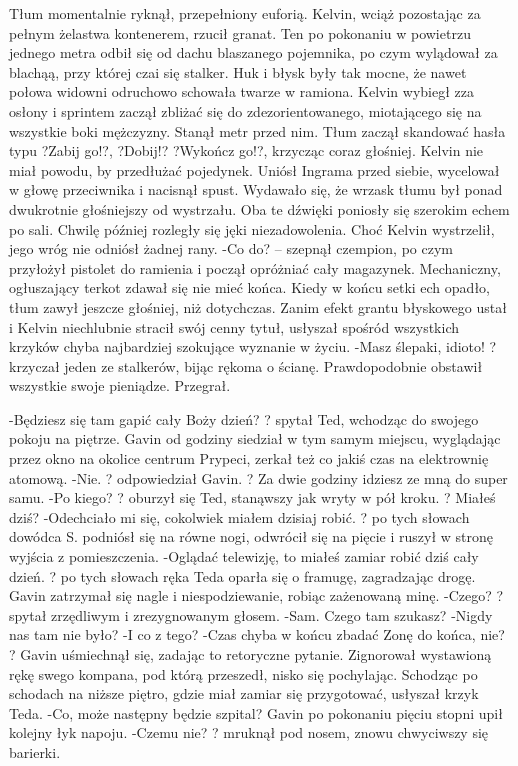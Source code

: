 \documentclass[../MAIN.tex]{subfiles}
\begin{document}
Tłum momentalnie ryknął, przepełniony euforią.
Kelvin, wciąż pozostając za pełnym żelastwa kontenerem, rzucił granat.
Ten po pokonaniu w powietrzu jednego metra odbił się od dachu blaszanego pojemnika, po czym wylądował za blachąą, przy której czai się stalker.
Huk i błysk były tak mocne, że nawet połowa widowni odruchowo schowała twarze w ramiona. Kelvin wybiegł zza osłony i sprintem zaczął zbliżać się do zdezorientowanego, miotającego się na wszystkie boki mężczyzny. Stanął metr przed nim.
Tłum zaczął skandować hasła typu ?Zabij go!?, ?Dobij!? ?Wykończ go!?, krzycząc coraz głośniej.
Kelvin nie miał powodu, by przedłużać pojedynek. Uniósł Ingrama przed siebie, wycelował w głowę przeciwnika i nacisnął spust.
Wydawało się, że wrzask tłumu był ponad dwukrotnie głośniejszy od wystrzału. Oba te dźwięki poniosły się szerokim echem po sali. Chwilę później rozległy się jęki niezadowolenia.
Choć Kelvin wystrzelił, jego wróg nie odniósł żadnej rany.
-Co do? -- szepnął czempion, po czym przyłożył pistolet do ramienia i począł opróżniać cały magazynek. Mechaniczny, ogłuszający terkot zdawał się nie mieć końca. Kiedy w końcu setki ech opadło, tłum zawył jeszcze głośniej, niż dotychczas.
Zanim efekt grantu błyskowego ustał i Kelvin niechlubnie stracił swój cenny tytuł, usłyszał spośród wszystkich krzyków chyba najbardziej szokujące wyznanie w życiu.
-Masz ślepaki, idioto! ? krzyczał jeden ze stalkerów, bijąc rękoma o ścianę. Prawdopodobnie obstawił wszystkie swoje pieniądze. Przegrał.

-Będziesz się tam gapić cały Boży dzień? ? spytał Ted, wchodząc do swojego pokoju na piętrze. Gavin od godziny siedział w tym samym miejscu, wyglądając przez okno na okolice centrum Prypeci, zerkał też co jakiś czas na elektrownię atomową.
-Nie. ? odpowiedział Gavin. ? Za dwie godziny idziesz ze mną do super samu.
-Po kiego? ? oburzył się Ted, stanąwszy jak wryty w pół kroku. ? Miałeś dziś?
-Odechciało mi się, cokolwiek miałem dzisiaj robić. ? po tych słowach dowódca S. podniósł się na równe nogi, odwrócił się na pięcie i ruszył w stronę wyjścia z pomieszczenia.
-Oglądać telewizję, to miałeś zamiar robić dziś cały dzień. ? po tych słowach ręka Teda oparła się o framugę, zagradzając drogę.
Gavin zatrzymał się nagle i niespodziewanie, robiąc zażenowaną minę.
-Czego? ? spytał zrzędliwym i zrezygnowanym głosem.
-Sam. Czego tam szukasz?
-Nigdy nas tam nie było?
-I co z tego?
-Czas chyba w końcu zbadać Zonę do końca, nie? ? Gavin uśmiechnął się, zadając to retoryczne pytanie. Zignorował wystawioną rękę swego kompana, pod którą przeszedł, nisko się pochylając. Schodząc po schodach na niższe piętro, gdzie miał zamiar się przygotować, usłyszał krzyk Teda.
-Co, może następny będzie szpital?
Gavin po pokonaniu pięciu stopni upił kolejny łyk napoju.
-Czemu nie? ? mruknął pod nosem, znowu chwyciwszy się barierki.
\end{document}

